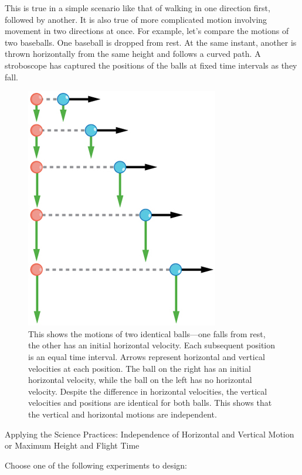 \documentclass[
]{book}
\begin{document}
This is true in a simple scenario like that of walking in one direction
first, followed by another. It is also true of more complicated motion
involving movement in two directions at once. For example, let's
compare the motions of two baseballs. One baseball is dropped from rest.
At the same instant, another is thrown horizontally from the same height
and follows a curved path. A stroboscope has captured the positions of
the balls at fixed time intervals as they fall.

\begin{figure}
\hypertarget{import-auto-id1165296248287}{%
\centering
\includegraphics{images/Figure_03_01_04a.jpg}
\caption{This shows the motions of two identical balls---one falls from rest,
the other has an initial horizontal velocity. Each subsequent position
is an equal time interval. Arrows represent horizontal and vertical
velocities at each position. The ball on the right has an initial
horizontal velocity, while the ball on the left has no horizontal
velocity. Despite the difference in horizontal velocities, the vertical
velocities and positions are identical for both balls. This shows that
the vertical and horizontal motions are
independent.}\label{import-auto-id1165296248287}
}
\end{figure}

\hypertarget{fs-id1909528}{}
Applying the Science Practices: Independence of Horizontal and Vertical
Motion or Maximum Height and Flight Time

Choose one of the following experiments to design:
\end{document}
